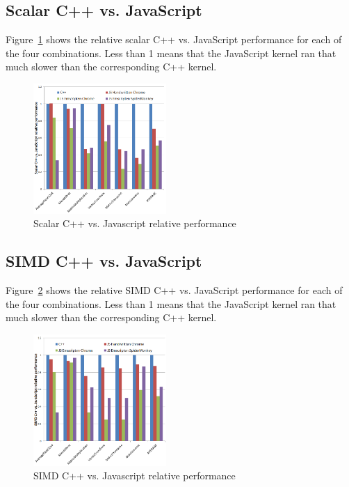 \documentclass[preprint]{sigplanconf}
\begin{document}
\subsection{Scalar C++ vs. JavaScript}

Figure~\ref{fig:cpp-js-scalar} shows the relative scalar C++ vs. JavaScript
performance for each of the four combinations. Less than 1 means that the 
JavaScript kernel ran that much slower than the corresponding C++ kernel.

\begin{figure}
\begin{center}
\includegraphics[width=0.45\textwidth]{figures/cpp-js-scalar.png}
\end{center}
\caption{Scalar C++ vs. Javascript relative performance}
\label{fig:cpp-js-scalar}
\end{figure}

\subsection{SIMD C++ vs. JavaScript}

Figure~\ref{fig:cpp-js-simd} shows the relative SIMD C++ vs. JavaScript
performance for each of the four combinations. Less than 1 means that the 
JavaScript kernel ran that much slower than the corresponding C++ kernel.

\begin{figure}
\begin{center}
\includegraphics[width=0.45\textwidth]{figures/cpp-js-simd.png}
\end{center}
\caption{SIMD C++ vs. Javascript relative performance}
\label{fig:cpp-js-simd}
\end{figure}
\end{document}
